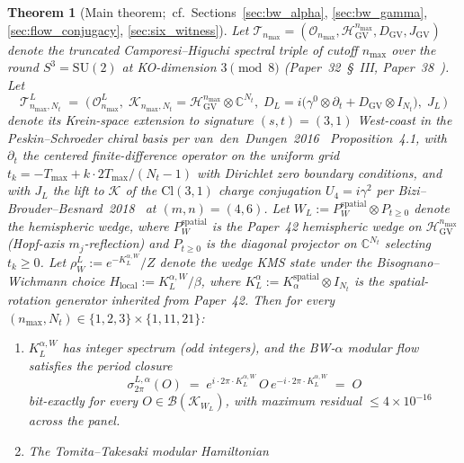 \documentclass[11pt,a4paper]{article}
\theoremstyle{plain}
\newtheorem{theorem}{Theorem}[section]
\theoremstyle{definition}
\newcommand{\nmax}{n_{\max}}
\newcommand{\Nt}{N_t}
\newcommand{\sthree}{S^{3}}
\newcommand{\Hilb}{\mathcal{H}}
\newcommand{\Krein}{\mathcal{K}}
\newcommand{\Op}{\mathcal{O}}
\newcommand{\Tcal}{\mathcal{T}}
\newcommand{\Bcal}{\mathcal{B}}
\newcommand{\C}{\mathbb{C}}
\newcommand{\SU}{\mathrm{SU}}
\newcommand{\DGV}{D_{\mathrm{GV}}}
\newcommand{\DL}{D_{L}}
\newcommand{\KL}{K_{L}}
\newcommand{\JL}{J_{L}}
\newcommand{\Cl}{\mathrm{Cl}}
\begin{document}
\begin{theorem}[Main theorem;\ cf.~Sections~\ref{sec:bw_alpha},
\ref{sec:bw_gamma}, \ref{sec:flow_conjugacy}, \ref{sec:six_witness}]
\label{thm:main_intro}
Let $\Tcal_{\nmax} = (\Op_{\nmax}, \Hilb_{\mathrm{GV}}^{\nmax},
\DGV, J_{\mathrm{GV}})$ denote the truncated Camporesi--Higuchi
spectral triple of cutoff $\nmax$ over the round $\sthree = \SU(2)$ at
KO-dimension $3 \pmod 8$ (Paper~32~\S~III, Paper~38~\cite{paper38}).
Let
\[
   \Tcal_{\nmax, \Nt}^L
   \;=\; \bigl(\,
     \Op_{\nmax}^L,\;
     \Krein_{\nmax, \Nt} = \Hilb_{\mathrm{GV}}^{\nmax} \otimes \C^{\Nt},\;
     \DL = i \bigl(\gamma^0 \otimes \partial_t
            + \DGV \otimes I_{\Nt}\bigr),\;
     \JL
   \,\bigr)
\]
denote its Krein-space extension to signature $(s, t) = (3, 1)$ West-coast
in the Peskin--Schroeder chiral basis per
van~den~Dungen~2016~\cite{vandungen2016} Proposition~4.1, with
$\partial_t$ the centered finite-difference operator on the uniform
grid $t_k = -T_{\max} + k \cdot 2T_{\max}/(\Nt - 1)$ with Dirichlet
zero boundary conditions, and with $\JL$ the lift to $\Krein$ of the
$\Cl(3, 1)$ charge conjugation $U_4 = i\gamma^2$ per
Bizi--Brouder--Besnard~2018~\cite{bizi_brouder_besnard2018} at
$(m, n) = (4, 6)$. Let $W_L := P_W^{\mathrm{spatial}} \otimes P_{t \ge 0}$
denote the hemispheric wedge, where $P_W^{\mathrm{spatial}}$ is the
Paper~42 hemispheric wedge on $\Hilb_{\mathrm{GV}}^{\nmax}$ (Hopf-axis
$m_j$-reflection) and $P_{t \ge 0}$ is the diagonal projector on
$\C^{\Nt}$ selecting $t_k \ge 0$. Let $\rho_W^L := e^{-\KL^{\alpha,
W}}/Z$ denote the wedge KMS state under the Bisognano--Wichmann choice
$H_{\mathrm{local}} := \KL^{\alpha, W} / \beta$, where
$\KL^\alpha := K_\alpha^{\mathrm{spatial}} \otimes I_{\Nt}$ is the
spatial-rotation generator inherited from Paper~42. Then for every
$(\nmax, \Nt) \in \{1, 2, 3\} \times \{1, 11, 21\}$:
\begin{enumerate}\setlength{\itemsep}{2pt}
\item[(i)] $\KL^{\alpha, W}$ has integer spectrum (odd integers),
and the BW-$\alpha$ modular flow satisfies the period closure
\begin{equation}\label{eq:bw_alpha_lorentz_main}
   \sigma_{2\pi}^{L, \alpha}(O)
   \;=\; e^{i \cdot 2\pi \cdot \KL^{\alpha, W}}\, O\,
         e^{-i \cdot 2\pi \cdot \KL^{\alpha, W}}
   \;=\; O
\end{equation}
bit-exactly for every $O \in \Bcal(\Krein_{W_L})$, with maximum
residual $\le 4 \times 10^{-16}$ across the panel.
\item[(ii)] The Tomita--Takesaki modular Hamiltonian

\end{enumerate}
\end{theorem}
\end{document}

